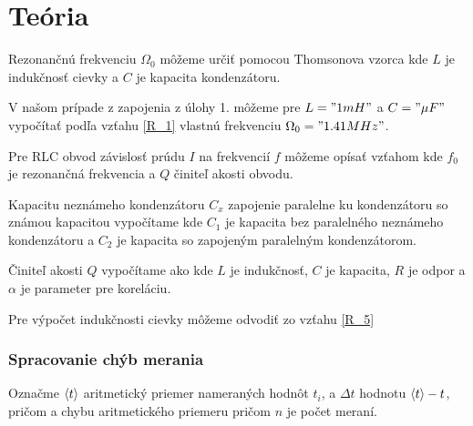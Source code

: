 \documentclass[a4paper,10pt]{article}
\begin{document}
\section{Teória}
Rezonančnú frekvenciu $\Omega_0$ môžeme určiť pomocou Thomsonova vzorca
kde $L$ je indukčnosť cievky a $C$ je kapacita kondenzátoru.

V našom prípade z zapojenia z úlohy 1. môžeme pre $L= "1 mH"$ a $C = "\mu F"$ vypočítať podľa vzťahu \ref{R_1} vlastnú frekvenciu  $\Omega_0= "1.41 MHz"$.

Pre RLC obvod závislosť prúdu $I$ na frekvencií $f$ môžeme opísať vzťahom
kde $f_0$ je rezonančná frekvencia a $Q$ činiteľ akosti obvodu. 

Kapacitu neznámeho kondenzátoru $C_x$ zapojenie paralelne ku kondenzátoru so známou kapacitou vypočítame
kde $C_1$ je kapacita bez paralelného neznámeho kondenzátoru a $C_2$ je kapacita so zapojeným paralelným kondenzátorom.


Činiteľ akosti $Q$ vypočítame ako 
kde $L$ je indukčnosť, $C$ je kapacita, $R$ je odpor a $\alpha$ je parameter pre koreláciu.

Pre výpočet indukčnosti cievky môžeme odvodiť zo vzťahu \ref{R_5}



\subsubsection{Spracovanie chýb merania}

Označme $\left< t \right>$ aritmetický priemer nameraných hodnôt $t_i$, a $\Delta t$ hodnotu $\left< t \right>-t$, pričom 
a chybu aritmetického priemeru 
pričom $n$ je počet meraní.
\end{document}
